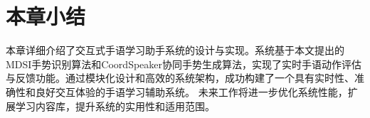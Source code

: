     
\section{本章小结}
本章详细介绍了交互式手语学习助手系统的设计与实现。系统基于本文提出的MDSI手势识别算法和CoordSpeaker协同手势生成算法，实现了实时手语动作评估与反馈功能。通过模块化设计和高效的系统架构，成功构建了一个具有实时性、准确性和良好交互体验的手语学习辅助系统。%
未来工作将进一步优化系统性能，扩展学习内容库，提升系统的实用性和适用范围。






